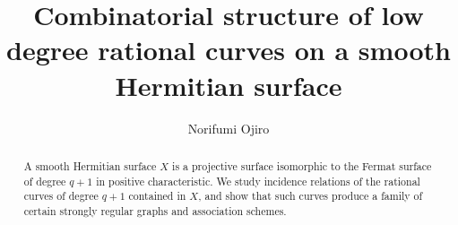 \documentclass[11pt]{amsart}
\title[Combinatorics of rational curves on a smooth Hermitian surface]
{Combinatorial structure of 
low degree rational curves on a smooth\\Hermitian surface
}
\author
{Norifumi Ojiro}
\date{}
\theoremstyle{plain} %
\theoremstyle{definition} %
\theoremstyle{remark} %
\begin{document}
\maketitle

\begin{abstract}
A smooth Hermitian surface $X$ is a projective surface isomorphic to the Fermat surface of degree $q+1$ in positive characteristic.
We study incidence relations of the rational curves of degree $q+1$ contained in $X$, and show that such curves produce a family of
certain strongly regular graphs and association schemes.
\end{abstract}
\end{document}
